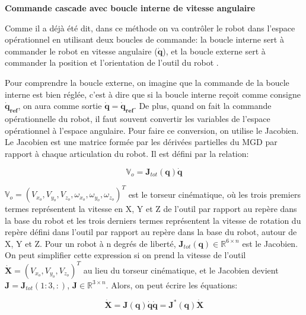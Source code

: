 \textbf{Commande cascade avec boucle interne de vitesse angulaire}
\newline

Comme il a déjà été dit, dans ce méthode on va contrôler le robot dans l'espace opérationnel en utilisant deux boucles de commande: la boucle interne sert à commander le robot en vitesse angulaire ($\bm{\dot{q}}$), et la boucle externe sert à commander la position et l'orientation de l'outil du robot \cite{KELLY20051423}.

Pour comprendre la boucle externe, on imagine que la commande de la boucle interne est bien réglée, c'est à dire que si la boucle interne reçoit comme consigne $ \bm{\dot{q}_{ref}} $, on aura comme sortie $ \bm{\dot{q}} = \bm{\dot{q}_{ref}} $. De plus, quand on fait la commande opérationnelle du robot, il faut souvent convertir les variables de l'espace opérationnel à l'espace angulaire. Pour faire ce conversion, on utilise le Jacobien. Le Jacobien est une matrice formée par les dérivées partielles du MGD par rapport à chaque articulation du robot. Il est défini par la relation:

\begin{equation}
	\mathbb{V}_{o} = \bm{J}_{tot}(\bm{q})\bm{\dot{q}}
\end{equation}

$ \mathbb{V}_{o} = (V_{x_{o}}, V_{y_{o}}, V_{z_{o}}, \omega_{x_{o}}, \omega_{y_{o}}, \omega_{z_{o}})^T $ est le torseur cinématique, où les trois premiers termes représentent la vitesse en X, Y et Z de l'outil par rapport au repère dans la base du robot et les trois derniers termes représentent la vitesse de rotation du repère défini dans l'outil par rapport au repère dans la base du robot, autour de X, Y et Z. Pour un robot à n degrés de liberté, $ \bm{J}_{tot}(\bm{q}) \in \mathbb{R}^{6 \times n} $ est le Jacobien. On peut simplifier cette expression si on prend la vitesse de l'outil $\bm{\dot{X}} = (V_{x_{o}}, V_{y_{o}}, V_{z_{o}})^T$ au lieu du torseur cinématique, et le Jacobien devient $\bm{J} = \bm{J}_{tot}(1:3,:)$, $ \bm{J} \in \mathbb{R}^{3 \times n} $. Alors, on peut écrire les équations: 

\begin{subequations}
	\begin{equation}
		\bm{\dot{X}} = \bm{J}(\bm{q})\bm{\dot{q}}
		\label{MCD}
	\end{equation}
	\begin{equation}
		\bm{\dot{q}} = \bm{J}^{\ast}(\bm{q})\bm{\dot{X}}
	\end{equation}
\end{subequations}

